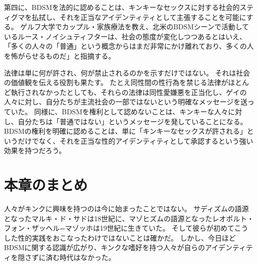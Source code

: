 \documentclass[paper=a4,book,openany]{jlreq}
\begin{document}
第四に、BDSMを法的に認めることは、キンキーなセックスに対する社会的スティグマを払拭し、それを正当なアイデンティティとして主張することを可能にする。
ゲルフ大学でカップル・家族療法を教え、北米のBDSMシーンで活動しているルース・ノイシュティフターは、社会の態度が変化しつつあるとはいえ、「多くの人々の「普通」という概念からはまだ非常にかけ離れており、多くの人を怖がらせるものだ」と指摘する\citep{mcarthur16:_its_traves_that_bdsm_isnt_techn_legal}。

法律は単に何が許され、何が禁止されるのかを示すだけではない。
それは社会の価値観を伝える役割も果たす。
たとえ同性間の性行為を禁じる法律がほとんど執行されなかったとしても、それらの法律は同性愛嫌悪を正当化し、ゲイの人々に対し、自分たちが主流社会の一部ではないという明確なメッセージを送っていた。
同様に、BDSMを権利として認めないことは、キンキーな人々に対し、自分たちは「普通ではない」というメッセージを発していることになる。
BDSMの権利を明確に認めることは、単に「キンキーなセックスが許される」というだけでなく、それを正当な性的アイデンティティとして承認するという強い効果を持つだろう。

\section{本章のまとめ}

人々がキンクに興味を持つのは今に始まったことではない。
サディズムの語源となったマルキ・ド・サドは18世紀に、マゾヒズムの語源となったレオポルト・フォン・ザッヘル=マゾッホは19世紀に生きていた。
そして彼らが初めてこうした性的実践をおこなったわけではないことは確かだ。
しかし、今日ほどBDSMに関する認識が広がり、キンクな嗜好を持つ人々が自らのアイデンティティを隠さずに済む時代はなかった。
\end{document}
